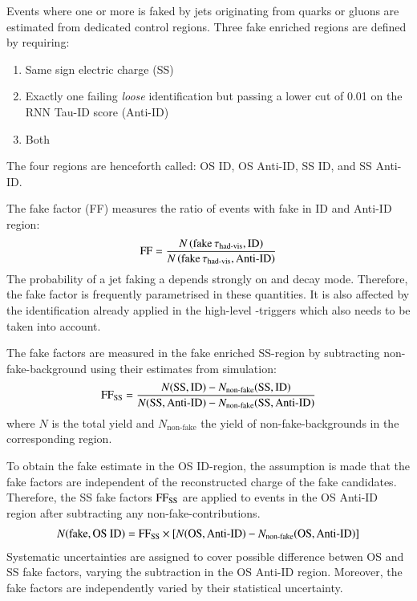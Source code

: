 \label{sec:hadhad_multijet}

Events where one or more \tauhadvis is faked by jets originating from quarks or
gluons are estimated from dedicated control regions. Three fake enriched regions
are defined by requiring:
\begin{enumerate}
\item Same sign electric charge \tauhadvis (SS)
\item Exactly one \tauhadvis failing \textit{loose} identification but passing a
  lower cut of 0.01 on the RNN Tau-ID score (Anti-ID)
\item Both
\end{enumerate}
The four regions are henceforth called: OS ID, OS Anti-ID, SS ID, and SS
Anti-ID.

The fake factor (FF) measures the ratio of events with fake \tauhadvis in ID and
Anti-ID region:
\begin{align*}
  \text{FF} = \frac{N\left( \text{fake} \, \tau_{\text{had-vis}}, \text{ID} \right)}{N\left( \text{fake} \, \tau_{\text{had-vis}}, \text{Anti-ID} \right)}
\end{align*}
The probability of a jet faking a \tauhadvis depends strongly on \tauhadvis \pT
and decay mode. Therefore, the fake factor is frequently parametrised in these
quantities. It is also affected by the \tauhadvis identification already applied
in the high-level \tauhadvis-triggers which also needs to be taken into account.

The fake factors are measured in the fake enriched SS-region by subtracting
non-fake-\tauhadvis background using their estimates from simulation:
\begin{align*}
  \text{FF}_\text{SS} = \frac{N(\text{SS}, \text{ID}) - N_\text{non-fake}(\text{SS}, \text{ID})}{N(\text{SS}, \text{Anti-ID}) - N_\text{non-fake}(\text{SS}, \text{Anti-ID})}
\end{align*}
where $N$ is the total yield and $N_\text{non-fake}$ the yield of
non-fake-\tauhadvis backgrounds in the corresponding region.

To obtain the fake \tauhadvis estimate in the OS ID-region, the assumption is
made that the fake factors are independent of the reconstructed charge of the
fake \tauhadvis candidates. Therefore, the SS fake factors $\text{FF}_\text{SS}$ are
applied to events in the OS Anti-ID region after subtracting any
non-fake-\tauhadvis contributions.
\begin{align*}
  N(\text{fake}, \text{OS ID}) = \text{FF}_\text{SS} \times \left[ N(\text{OS}, \text{Anti-ID}) - N_\text{non-fake}(\text{OS}, \text{Anti-ID}) \right]
\end{align*}
Systematic uncertainties are assigned to
cover possible difference betwen OS and SS fake factors, varying the
subtraction in the OS Anti-ID region. Moreover, the fake factors are
independently varied by their statistical uncertainty.

